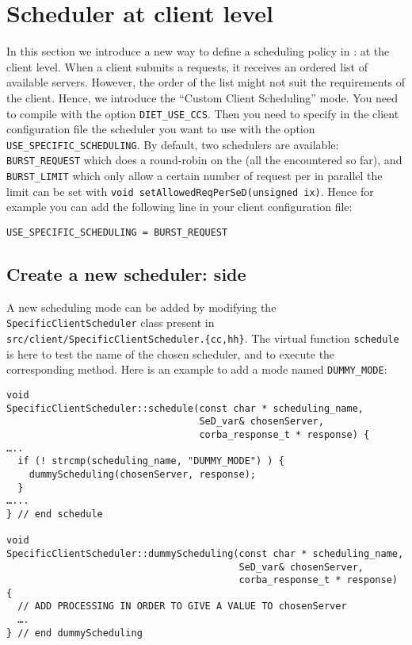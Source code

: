 
\section{Scheduler at client level}

In this section we introduce a new way to define a scheduling policy
in \diet: at the client level. When a client submits a requests, it
receives an ordered list of available servers. However, the order of
the list might not suit the requirements of the client. Hence, we
introduce the ``Custom Client Scheduling'' mode. You need to compile
\diet with the option \texttt{DIET\_USE\_CCS}. Then you need to specify
in the client configuration file the scheduler you want to use with
the option \texttt{USE\_SPECIFIC\_SCHEDULING}. By
default, two schedulers are available: \texttt{BURST\_REQUEST} which
does a round-robin on the \sed (all the encountered \sed so far), and
\texttt{BURST\_LIMIT} which only allow a certain number of request per
\sed in parallel the limit can be set with
\verb|void setAllowedReqPerSeD(unsigned ix)|.
Hence for example you can add the following line in your client
configuration file:
\begin{verbatim}
USE_SPECIFIC_SCHEDULING = BURST_REQUEST
\end{verbatim}



\subsection{Create a new scheduler: \diet side}


A new scheduling mode can be added by modifying the
\texttt{SpecificClientScheduler} class present in
\texttt{src/client/SpecificClientScheduler.\{cc,hh\}}.
The virtual function \texttt{schedule} is here to test the name of the
chosen scheduler, and to execute the corresponding method.
Here is an example to add a mode named \texttt{DUMMY\_MODE}:
\begin{verbatim}
void
SpecificClientScheduler::schedule(const char * scheduling_name,
                                  SeD_var& chosenServer,
                                  corba_response_t * response) {
…..
  if (! strcmp(scheduling_name, "DUMMY_MODE") ) {
    dummyScheduling(chosenServer, response);
  }
…...
} // end schedule

void
SpecificClientScheduler::dummyScheduling(const char * scheduling_name,
                                         SeD_var& chosenServer,
                                         corba_response_t * response) {
  // ADD PROCESSING IN ORDER TO GIVE A VALUE TO chosenServer
  ….
} // end dummyScheduling
\end{verbatim}


